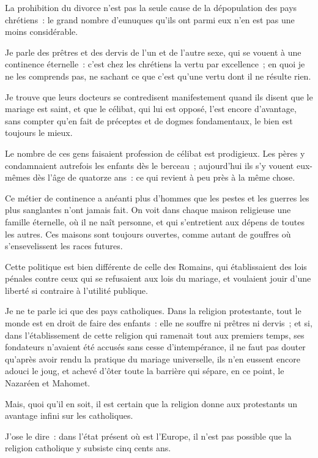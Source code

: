 \documentclass[french,twoside]{book} %
\begin{document}
\noindent La prohibition du divorce n’est pas la seule cause de la dépopulation des pays chrétiens : le grand nombre d’eunuques qu’ils ont parmi eux n’en est pas une moins considérable.\par
Je parle des prêtres et des dervis de l’un et de l’autre sexe, qui se vouent à une continence éternelle : c’est chez les chrétiens la vertu par excellence ; en quoi je ne les comprends pas, ne sachant ce que c’est qu’une vertu dont il ne résulte rien.\par
Je trouve que leurs docteurs se contredisent manifestement quand ils disent que le mariage est saint, et que le célibat, qui lui est opposé, l’est encore d’avantage, sans compter qu’en fait de préceptes et de dogmes fondamentaux, le bien est toujours le mieux.\par
Le nombre de ces gens faisaient profession de célibat est prodigieux. Les pères y condamnaient autrefois les enfants dès le berceau ; aujourd’hui ils s’y vouent eux-mêmes dès l’âge de quatorze ans : ce qui revient à peu près à la même chose.\par
Ce métier de continence a anéanti plus d’hommes que les pestes et les guerres les plus sanglantes n’ont jamais fait. On voit dans chaque maison religieuse une famille éternelle, où il ne naît personne, et qui s’entretient aux dépens de toutes les autres. Ces maisons sont toujours ouvertes, comme autant de gouffres où s’ensevelissent les races futures.\par
Cette politique est bien différente de celle des Romains, qui établissaient des lois pénales contre ceux qui se refusaient aux lois du mariage, et voulaient jouir d’une liberté si contraire à l’utilité publique.\par
Je ne te parle ici que des pays catholiques. Dans la religion protestante, tout le monde est en droit de faire des enfants : elle ne souffre ni prêtres ni dervis ; et si, dans l’établissement de cette religion qui ramenait tout aux premiers temps, ses fondateurs n’avaient été accusés sans cesse d’intempérance, il ne faut pas douter qu’après avoir rendu la pratique du mariage universelle, ils n’en eussent encore adouci le joug, et achevé d’ôter toute la barrière qui sépare, en ce point, le Nazaréen et Mahomet.\par
Mais, quoi qu’il en soit, il est certain que la religion donne aux protestants un avantage infini sur les catholiques.\par
J’ose le dire : dans l’état présent où est l’Europe, il n’est pas possible que la religion catholique y subsiste cinq cents ans.\par
\end{document}
